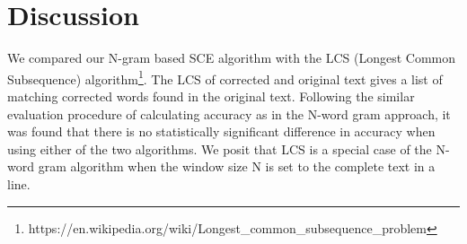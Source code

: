 \documentclass[preprint,11pt]{elsarticle}
\begin{document}
\section{Discussion}
\label{spell:discuss}
We compared our N-gram based SCE algorithm with the LCS (Longest Common Subsequence) algorithm\footnote{https://en.wikipedia.org/wiki/Longest\_common\_subsequence\_problem}. The LCS of corrected and original text gives a list of matching corrected words found in the original text. Following the similar evaluation procedure of calculating accuracy as in the N-word gram approach, %
it was found that there is no statistically significant difference in accuracy when using either of the two algorithms. We posit that LCS is a special case of the N-word gram algorithm when the window size N is set to the complete text in a line.
\end{document}
